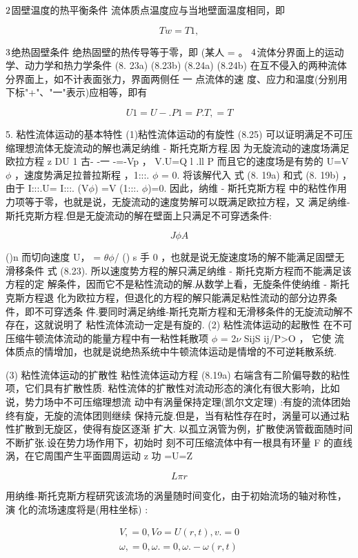 ${\rm 2}$固壁温度的热平衡条件 流体质点温度应与当地壁面温度相同，即

\[T w = T1,\]

${\rm 3}$绝热固壁条件 绝热固壁的热传导等于零，即 (某人 = 。 ${\rm 4}$流体分界面上的运动学、动力学和热力学条件 (8. 23a) (8.23b) (8.24a) (8.24b) 在互不侵入的两种流体分界面上，如不计表面张力，界面两侧任 一 点流体的速 度、应力和温度(分别用下标"+"、"一"表示)应相等，即有

\[U1 = U-. P 1 = P. T , = T\]

5. 粘性流体运动的基本特性 (1)粘性流体运动的有旋性 (8.25) 可以证明满足不可压缩理想流体无旋流动的解也满足纳维 - 斯托克斯方程.因 为无旋流动的速度场满足欧拉方程 z DU 1 古- -一 -=-Vp ， V.U=Q l .ll P 而且它的速度场是有势的 U=V$\phi$ ，速度势满足拉普拉斯程 ，1:::. $\phi$ = 0. 将该解代入 式 (8. 19a) 和式 (8. 19b) ，由于 I:::.U= I:::. (V$\phi$) =V (1:::. $\phi$)=0. 因此，纳维 - 斯托克斯方程 中的粘性作用力项等于零，也就是说，无旋流动的速度势解可以既满足欧拉方程，又 满足纳维-斯托克斯方程.但是无旋流动的解在壁面上只满足不可穿透条件:

\[J\phi A\]

()n 而切向速度 U， = $\theta$$\phi$/ () s 手 0 ，也就是说无旋速度场的解不能满足固壁无滑移条件 式 (8.23). 所以速度势方程的解只满足纳维 - 斯托克斯方程而不能满足该方程的定 解条件，因而它不是粘性流动的解.从数学上看，无旋条件使纳维 - 斯托克斯方程退 化为欧拉方程，但退化的方程的解只能满足粘性流动的部分边界条件，即不可穿透条 件.要同时满足纳维-斯托克斯方程和无滑移条件的无旋流动解不存在，这就说明了 粘性流体流动一定是有旋的. (2) 粘性流体运动的起散性 在不可压缩牛顿流体流动的能量方程中有一粘性耗散项 $\phi$ = 2$\nu$ SijS ij/P>O ， 它使 流体质点的情增加，也就是说绝热系统中牛顿流体运动是情增的不可逆耗散系统.

(3) 粘性流体运动的扩散性 粘性流体运动方程 (8.19a) 右端含有二阶偏导数的粘性项，它们具有扩散性质. 粘性流体的扩散性对流动形态的演化有很大影响，比如说，势力场中不可压缩理想流 动中有涡量保持定理(凯尔文定理) :有旋的流体团始终有旋，无旋的流体团则继续 保持元旋.但是，当有粘性存在时，涡量可以通过粘性扩散到无旋区，使得有旋区逐渐 扩大. 以孤立涡管为例，扩散使涡管截面随时间不断扩张.设在势力场作用下，初始时 刻不可压缩流体中有一根具有环量 F 的直线涡，在它周围产生平面圆周运动 z 功 =U=Z

\[L\pi r\]

用纳维-斯托克斯方程研究该流场的涡量随时间变化，由于初始流场的轴对称性，演 化的流场速度将是(用柱坐标) :

\begin{gather*}
V, = 0 , Vo = U (r , t) , v. = 0\\
\omega ,  = 0 ,  \omega . = 0 ,  \omega .-\omega  (r ,  t)
\end{gather*}

